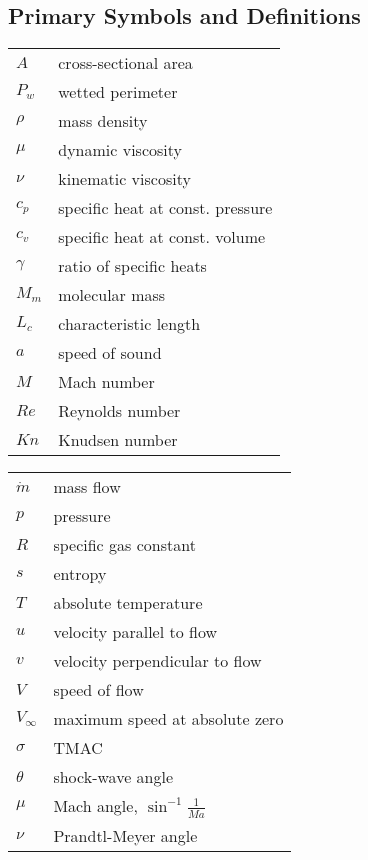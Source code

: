 \subsection*{Primary Symbols and Definitions}

\renewcommand{\arraystretch}{1.2}
\begin{multicols}{2}
\begin{flushleft}
\begin{tabular}{ll}
$A$         & cross-sectional area \\
$P_w$       & wetted perimeter \\
$\rho$      & mass density \\
$\mu$       & dynamic viscosity \\
$\nu$       & kinematic viscosity \\
$c_p$       & specific heat at const. pressure \\
$c_v$       & specific heat at const. volume \\
$\gamma$    & ratio of specific heats \\
$M_m$       & molecular mass \\
$L_c$       & characteristic length \\
$a$         & speed of sound \\
$M$         & Mach number \\
$Re$        & Reynolds number \\ 
$Kn$        & Knudsen number \\
\end{tabular}
\end{flushleft}
\columnbreak
\begin{flushleft}
\begin{tabular}{ll}
$\dot{m}$   & mass flow \\
$p$         & pressure \\
$R$         & specific gas constant \\
$s$         & entropy\\
$T$         & absolute temperature \\
$u$         & velocity parallel to flow \\
$v$         & velocity perpendicular to flow \\
$V$         & speed of flow \\
$V_\infty$  & maximum speed at absolute zero\\
$\sigma$    & TMAC \\
$\theta$    & shock-wave angle \\
$\mu$       & Mach angle, $\sin^{-1}\frac{1}{Ma}$ \\
$\nu$       & Prandtl-Meyer angle \\
\end{tabular}
\end{flushleft}
\end{multicols}


